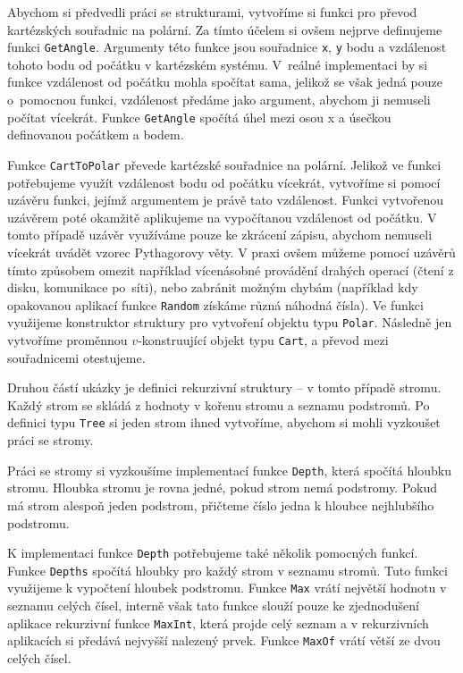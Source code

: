 Abychom si předvedli práci se strukturami, vytvoříme si funkci pro převod kartézských souřadnic
na polární. Za tímto účelem si ovšem nejprve definujeme funkci \lstinline{GetAngle}. Argumenty
této funkce jsou souřadnice \lstinline{x}, \lstinline{y} bodu a vzdálenost tohoto bodu od počátku
v kartézském systému. V~reálné implementaci by si funkce vzdálenost od počátku mohla spočítat sama,
jelikož se však jedná pouze o~pomocnou funkci, vzdálenost předáme jako argument, abychom ji nemuseli
počítat vícekrát. Funkce \lstinline{GetAngle} spočítá úhel mezi osou x a úsečkou definovanou
počátkem a bodem.

Funkce \lstinline{CartToPolar} převede kartézské souřadnice na polární. Jelikož ve funkci
potřebujeme využít vzdálenost bodu od počátku vícekrát, vytvoříme si pomocí uzávěru funkci, jejímž
argumentem je právě tato vzdálenost. Funkci vytvořenou uzávěrem poté okamžitě aplikujeme
na vypočítanou vzdálenost od počátku. V tomto případě uzávěr využíváme pouze ke zkrácení zápisu,
abychom nemuseli vícekrát uvádět vzorec Pythagorovy věty. V praxi ovšem můžeme pomocí uzávěrů
tímto způsobem omezit například vícenásobné provádění drahých operací (čtení z disku, komunikace
po~síti), nebo zabránit možným chybám (například kdy opakovanou aplikací funkce \lstinline{Random}
získáme různá náhodná čísla). Ve funkci využijeme konstruktor struktury pro vytvoření objektu typu
\lstinline{Polar}. Následně jen vytvoříme proměnnou $v$-konstruující objekt typu \lstinline{Cart},
a převod mezi souřadnicemi otestujeme.

Druhou částí ukázky je definici rekurzivní struktury -- v tomto případě stromu. Každý strom se skládá
z hodnoty v kořenu stromu a seznamu podstromů. Po definici typu \lstinline{Tree} si jeden strom
ihned vytvoříme, abychom si mohli vyzkoušet práci se stromy.

Práci se stromy si vyzkoušíme implementací funkce \lstinline{Depth}, která spočítá hloubku stromu.
Hloubka stromu je rovna jedné, pokud strom nemá podstromy. Pokud má strom alespoň jeden podstrom,
přičteme číslo jedna k hloubce nejhlubšího podstromu.

K implementaci funkce \lstinline{Depth} potřebujeme také několik pomocných funkcí. Funkce
\lstinline{Depths} spočítá hloubky pro každý strom v seznamu stromů. Tuto funkci využijeme
k vypočtení hloubek podstromu. Funkce \lstinline{Max} vrátí největší hodnotu v seznamu celých
čísel, interně však tato funkce slouží pouze ke zjednodušení aplikace rekurzivní funkce
\lstinline{MaxInt}, která projde celý seznam a v rekurzivních aplikacích si předává
nejvyšší nalezený prvek. Funkce \lstinline{MaxOf} vrátí větší ze dvou celých čísel.


